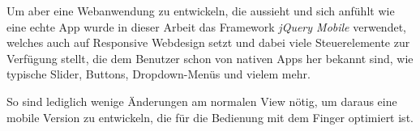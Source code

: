 Um aber eine Webanwendung zu entwickeln, die aussieht und sich \glqq anfühlt\grqq{} wie eine echte App wurde in dieser Arbeit das Framework \emph{jQuery Mobile} verwendet, welches auch auf Responsive Webdesign setzt und dabei viele Steuerelemente zur Verfügung stellt, die dem Benutzer schon von nativen Apps her bekannt sind, wie typische Slider, Buttons, Dropdown-Menüs und vielem mehr.\par

So sind lediglich wenige Änderungen am normalen View nötig, um daraus eine mobile Version zu entwickeln, die für die Bedienung mit dem Finger optimiert ist.
